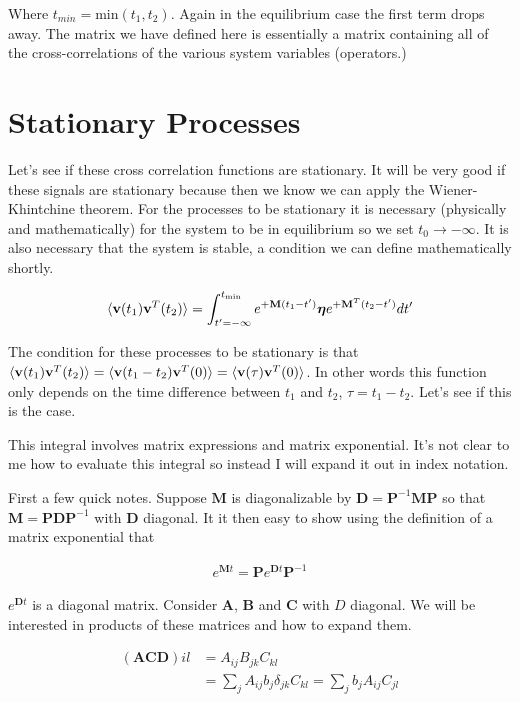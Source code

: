 \documentclass[12pt]{article}
\newcommand{\bv}[1]{\mathbf{#1}}
\begin{document}
Where $t_{min} = \text{min}(t_1,t_2)$. Again in the equilibrium case the first term drops away. The matrix we have defined here is essentially a matrix containing all of the cross-correlations of the various system variables (operators.)

\section{Stationary Processes}
Let's see if these cross correlation functions are stationary. It will be very good if these signals are stationary because then we know we can apply the Wiener-Khintchine theorem. For the processes to be stationary it is necessary (physically and mathematically) for the system to be in equilibrium so we set $t_0 \rightarrow -\infty$. It is also necessary that the system is stable, a condition we can define mathematically shortly.

\begin{align}
\braket{\bv{v}(t_1)\bv{v}^T(t_2)} = \int_{t'=-\infty}^{t_{\text{min}}} e^{+\bv{M}(t_1-t')} \boldsymbol{\eta} e^{+\bv{M}^T (t_2-t')} dt'
\end{align}

The condition for these processes to be stationary is that $\braket{\bv{v}(t_1)\bv{v}^T(t_2)} = \braket{\bv{v}(t_1-t_2)\bv{v}^T(0)} = \braket{\bv{v}(\tau)\bv{v}^T(0)}$. In other words this function only depends on the time difference between $t_1$ and $t_2$, $\tau = t_1-t_2$. Let's see if this is the case. 

This integral involves matrix expressions and matrix exponential. It's not clear to me how to evaluate this integral so instead I will expand it out in index notation.

First a few quick notes. Suppose $\bv{M}$ is diagonalizable by $\bv{D} = \bv{P}^{-1}\bv{M} \bv{P}$ so that $\bv{M} = \bv{P}\bv{D}\bv{P}^{-1}$ with $\bv{D}$ diagonal. It it then easy to show using the definition of a matrix exponential that

\begin{align}
e^{\bv{M} t} = \bv{P}e^{\bv{D} t} \bv{P}^{-1}
\end{align} 

$e^{\bv{D}t}$ is a diagonal matrix. Consider $\bv{A}$, $\bv{B}$ and $\bv{C}$ with $D$ diagonal. We will be interested in products of these matrices and how to expand them.

\begin{align}
(\bv{A}\bv{C}\bv{D}){il} &= A_{ij} B_{jk} C_{kl}\\
&= \sum_{j} A_{ij} b_j \delta_{jk} C_{kl} =  \sum_{j} b_j  A_{ij} C_{jl}
\end{align}
\end{document}

